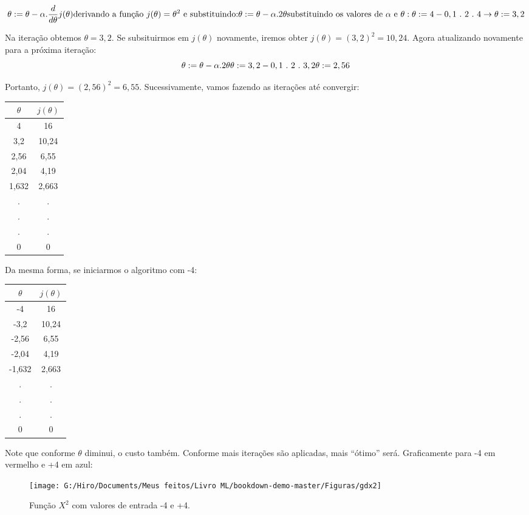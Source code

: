 \documentclass[
]{book}
\begin{document}
\[\theta := \theta-\alpha.\frac{d}{d\theta}j(\theta) \\ 
\mbox{derivando a função} \ j(\theta)=\theta^2 \ \mbox{e substituindo:}
\\ \theta:= \theta -\alpha.2\theta \\ \mbox{substituindo os valores de}\ \alpha\ \mbox{e}\ \theta: \\ \theta:=4-0,1 \ .\ 2\ .\ 4 \\
\rightarrow \theta:=3,2\]

Na iteração obtemos \(\theta=3,2\). Se subsituirmos em \(j(\theta)\) novamente, iremos obter \(j(\theta)=(3,2)^2=10,24\). Agora atualizando novamente para a próxima iteração:
\[\theta:= \theta -\alpha.2\theta \\ \theta:=3,2-0,1\ .\ 2\ .\ 3,2 \\
\theta:= 2,56\]

Portanto, \(j(\theta)=(2,56)^2=6,55\). Sucessivamente, vamos fazendo as iterações até convergir:

\begin{longtable}[]{@{}cc@{}}
\toprule
\textbf{\(\theta\)} & \textbf{\(j(\theta)\)}\tabularnewline
\midrule
\endhead
4 & 16\tabularnewline
3,2 & 10,24\tabularnewline
2,56 & 6,55\tabularnewline
2,04 & 4,19\tabularnewline
1,632 & 2,663\tabularnewline
. & .\tabularnewline
. & .\tabularnewline
. & .\tabularnewline
0 & 0\tabularnewline
\bottomrule
\end{longtable}

Da mesma forma, se iniciarmos o algoritmo com -4:

\begin{longtable}[]{@{}cc@{}}
\toprule
\textbf{\(\theta\)} & \textbf{\(j(\theta)\)}\tabularnewline
\midrule
\endhead
-4 & 16\tabularnewline
-3,2 & 10,24\tabularnewline
-2,56 & 6,55\tabularnewline
-2,04 & 4,19\tabularnewline
-1,632 & 2,663\tabularnewline
. & .\tabularnewline
. & .\tabularnewline
. & .\tabularnewline
0 & 0\tabularnewline
\bottomrule
\end{longtable}

Note que conforme \(\theta\) diminui, o custo também. Conforme mais iterações são aplicadas, mais ``ótimo'' será. Graficamente para -4 em vermelho e +4 em azul:

\begin{figure}

{\centering \texttt{[image: G:/Hiro/Documents/Meus feitos/Livro ML/bookdown-demo-master/Figuras/gdx2]} 

}

\caption{Função \(X^2\) com valores de entrada -4 e +4.}\label{fig:gdx2}
\end{figure}
\end{document}
